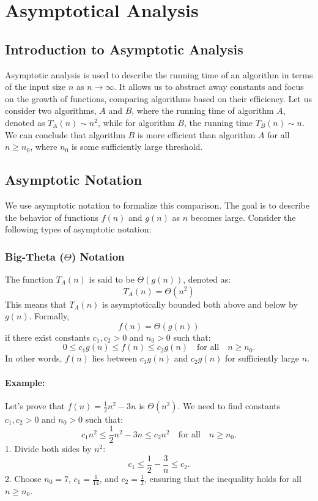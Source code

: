 \chapter{Asymptotical Analysis}
    \section{Introduction to Asymptotic Analysis}
    
    Asymptotic analysis is used to describe the running time of an algorithm in terms of the input size \(n\) as \(n \rightarrow \infty\). It allows us to abstract away constants and focus on the growth of functions, comparing algorithms based on their efficiency. \newline    
    Let us consider two algorithms, \(A\) and \(B\), where the running time of algorithm \(A\), denoted as \(T_A(n) \sim n^2\), while for algorithm \(B\), the running time \(T_B(n) \sim n\). We can conclude that algorithm \(B\) is more efficient than algorithm \(A\) for all \(n \geq n_0\), where \(n_0\) is some sufficiently large threshold.
    
    \section{Asymptotic Notation}
    
    We use asymptotic notation to formalize this comparison. The goal is to describe the behavior of functions \(f(n)\) and \(g(n)\) as \(n\) becomes large. Consider the following types of asymptotic notation:
    
    \subsection{Big-Theta (\(\Theta\)) Notation}
    
    The function \(T_A(n)\) is said to be \(\Theta(g(n))\), denoted as:
    \[
    T_A(n) = \Theta(n^2)
    \]
    This means that \(T_A(n)\) is asymptotically bounded both above and below by \(g(n)\). Formally, 
    \[
    f(n) = \Theta(g(n))
    \] if there exist constants \(c_1, c_2 > 0\) and \(n_0 > 0\) such that:
    \[
    0 \leq c_1 g(n) \leq f(n) \leq c_2 g(n) \quad \text{for all} \quad n \geq n_0.
    \]
    In other words, \(f(n)\) lies between \(c_1 g(n)\) and \(c_2 g(n)\) for sufficiently large \(n\).
    
    \subsubsection{Example:}
    Let’s prove that \(f(n) = \frac{1}{2}n^2 - 3n\) is \(\Theta(n^2)\). \newline
    We need to find constants \(c_1, c_2 > 0\) and \(n_0 > 0\) such that:
    \[
    c_1 n^2 \leq \frac{1}{2}n^2 - 3n \leq c_2 n^2 \quad \text{for all} \quad n \geq n_0.
    \]
    1. Divide both sides by \(n^2\):
    \[
    c_1 \leq \frac{1}{2} - \frac{3}{n} \leq c_2.
    \]
    2. Choose \(n_0 = 7\), \(c_1 = \frac{1}{14}\), and \(c_2 = \frac{1}{2}\), ensuring that the inequality holds for all \(n \geq n_0\).
    
